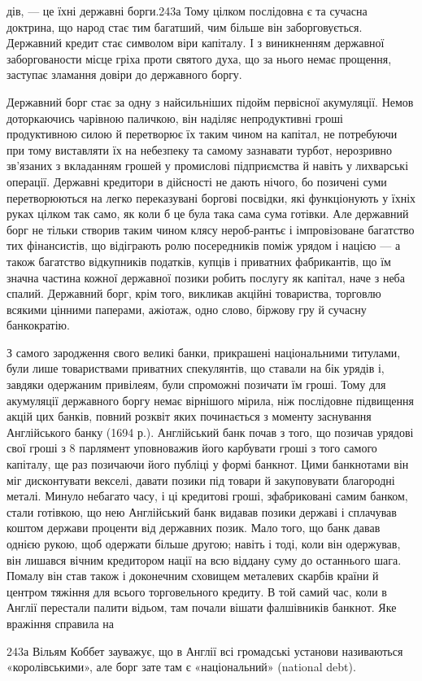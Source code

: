 дів, — це їхні державні борги.243а Тому цілком послідовна є та сучасна доктрина, що народ стає тим
багатший, чим більше він заборговується. Державний кредит стає символом віри капіталу. І з
виникненням державної заборгованости місце гріха проти
святого духа, що за нього немає прощення, заступає зламання довіри до державного боргу.

Державний борг стає за одну з найсильніших підойм первісної акумуляції. Немов доторкаючись чарівною
паличкою, він наділяє непродуктивні гроші продуктивною силою й перетворює їх таким чином на капітал,
не потребуючи при тому виставляти
їх на небезпеку та самому зазнавати турбот, нерозривно зв’язаних з вкладанням грошей у промислові
підприємства й навіть у лихварські операції. Державні кредитори в дійсності не дають нічого, бо
позичені суми перетворюються на легко переказувані
боргові посвідки, які функціонують у їхніх руках цілком так само, як коли б це була така сама сума
готівки. Але державний борг не тільки створив таким чином клясу нероб-рантьє і імпровізоване
багатство тих фінансистів, що відіграють ролю посередників
поміж урядом і нацією — а також багатство відкупників податків, купців і приватних фабрикантів, що
їм значна частина кожної державної позики робить послугу як капітал, наче з неба спалий. Державний
борг, крім того, викликав акційні товариства,
торговлю всякими цінними паперами, ажіотаж, одно слово, біржову гру й сучасну банкократію.

З самого зародження свого великі банки, прикрашені національними титулами, були лише товариствами
приватних спекулянтів, що ставали на бік урядів і, завдяки одержаним привілеям, були спроможні
позичати їм гроші. Тому для акумуляції
державного боргу немає вірнішого мірила, ніж послідовне підвищення акцій цих банків, повний розквіт
яких починається з моменту заснування Англійського банку (1694 р.). Англійський банк почав з того,
що позичав урядові свої гроші з 8%
парлямент уповноважив його карбувати гроші з того самого капіталу, ще раз позичаючи його публіці у
формі банкнот. Цими банкнотами він міг дисконтувати векселі, давати позики під товари й закуповувати
благородні металі. Минуло небагато
часу, і ці кредитові гроші, зфабриковані самим банком, стали готівкою, що нею Англійський банк
видавав позики державі і сплачував коштом держави проценти від державних позик. Мало того, що банк
давав однією рукою, щоб одержати більше другою; навіть і тоді, коли він одержував, він лишався
вічним кредитором нації на всю віддану суму до останнього шага. Помалу він став також і доконечним
сховищем металевих скарбів країни й центром тяжіння для всього торговельного кредиту.
В той самий час, коли в Англії перестали палити відьом, там почали вішати фалшівників банкнот. Яке
вражіння справила на

243а Вільям Коббет зауважує, що в Англії всі громадські установи
називаються «королівськими», але борг зате там є «національний» (national debt).
